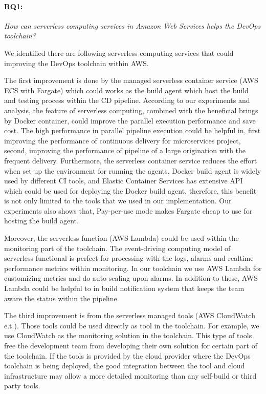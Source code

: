 \paragraph{RQ1:} \textit{How can serverless computing services in Amazon Web Services helps the DevOps toolchain?}
\medskip
\par
We identified there are following serverless computing services that could improving the DevOps toolchain within AWS.
\par
The first improvement is done by the managed serverless container service (AWS ECS with Fargate) which could works as the build agent which host the build and testing process within the CD pipeline. According to our experiments and analysis, the feature of serverless computing, combined with the beneficial brings by Docker container, could improve the parallel execution performance and save cost. The high performance in parallel pipeline execution could be helpful in, first improving the performance of continuous delivery for microservices project, second, improving the performance of pipeline of a large origination with the frequent delivery. Furthermore, the serverless container service reduces the effort when set up the environment for running the agents. Docker build agent is widely used by different CI tools, and Elastic Container Services has extensive API which could be used for deploying the Docker build agent, therefore, this benefit is not only limited to the tools that we used in our implementation. Our experiments also shows that, Pay-per-use mode makes Fargate cheap to use for hosting the build agent.
\par
Moreover, the serverless function (AWS Lambda) could be used within the monitoring part of the toolchain. The event-driving computing model of serverless functional is perfect for processing with the logs, alarms and realtime performance metrics within monitoring. In our toolchain we use AWS Lambda for customizing metrics and do auto-scaling upon alarms. In addition to these, AWS Lambda could be helpful to in build notification system that keeps the team aware the status within the pipeline.
\par
The third improvement is from the serverless managed tools (AWS CloudWatch e.t.). Those tools could be used directly as tool in the toolchain. For example, we use CloudWatch as the monitoring solution in the toolchain. This type of tools free the development team from developing their own solution for certain part of the toolchain. If the tools is provided by the cloud provider where the DevOps toolchain is being deployed, the good integration between the tool and cloud infrastructure may allow a more detailed monitoring than any self-build or third party tools.
